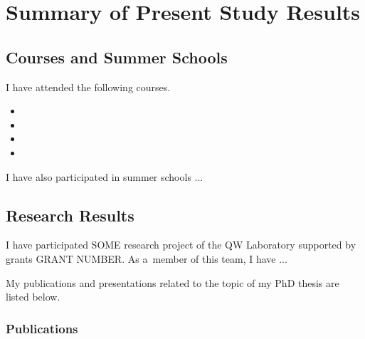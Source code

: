 \documentclass[11pt,a4paper]{report}
\newcounter{counter}[section]
\begin{document}

\newpage
{}





\appendix

\chapter{Summary of Present Study Results}\label{app:results}

\section{Courses and Summer Schools}
I have attended the following courses.
\begin{itemize}
\item 
\item 
\item 
\item 
\end{itemize}

I have also participated in summer schools ...

\section{Research Results}

I have participated  SOME research project of the QW Laboratory supported by grants
GRANT NUMBER. As a~member of this team, I have ...

 My publications and presentations related
to the topic of my PhD thesis are listed below.

\subsection*{Publications}
\end{document}
